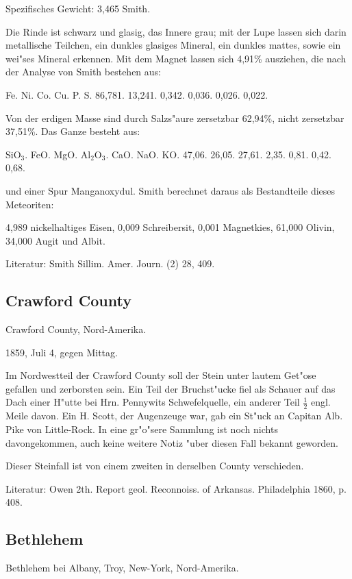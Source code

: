 \documentclass[a4paper, 11pt, oneside]{article}
\begin{document}
Spezifisches Gewicht: 3,465 Smith.

Die Rinde ist schwarz und glasig, das Innere grau; mit der Lupe lassen sich darin metallische Teilchen, ein dunkles glasiges Mineral, ein dunkles mattes, sowie ein wei"ses Mineral erkennen. Mit dem Magnet lassen sich 4,91\% ausziehen, die nach der Analyse von Smith bestehen aus:

Fe. Ni. Co. Cu. P. S.  
86,781. 13,241. 0,342. 0,036. 0,026. 0,022.

Von der erdigen Masse sind durch Salzs"aure zersetzbar 62,94\%, nicht zersetzbar 37,51\%. Das Ganze besteht aus:

SiO$_{3}$. FeO. MgO. Al$_{2}$O$_{3}$. CaO. NaO. KO.  
47,06. 26,05. 27,61. 2,35. 0,81. 0,42. 0,68.

und einer Spur Manganoxydul. Smith berechnet daraus als Bestandteile dieses Meteoriten:

4,989 nickelhaltiges Eisen,  
0,009 Schreibersit,  
0,001 Magnetkies,  
61,000 Olivin,  
34,000 Augit und Albit.

Literatur: Smith Sillim. Amer. Journ. (2) 28, 409.

\subsection{Crawford County}

Crawford County, Nord-Amerika.

1859, Juli 4, gegen Mittag.

Im Nordwestteil der Crawford County soll der Stein unter lautem Get"ose gefallen und zerborsten sein. Ein Teil der Bruchst"ucke fiel als Schauer auf das Dach einer H"utte bei Hrn. Pennywits Schwefelquelle, ein anderer Teil $\frac{1}{2}$ engl. Meile davon. Ein H. Scott, der Augenzeuge war, gab ein St"uck an Capitan Alb. Pike von Little-Rock. In eine gr"o"sere Sammlung ist noch nichts davongekommen, auch keine weitere Notiz "uber diesen Fall bekannt geworden.

Dieser Steinfall ist von einem zweiten in derselben County verschieden.

Literatur: Owen 2th. Report geol. Reconnoiss. of Arkansas. Philadelphia 1860, p. 408.

\subsection{Bethlehem}

Bethlehem bei Albany, Troy, New-York, Nord-Amerika.
\end{document}
